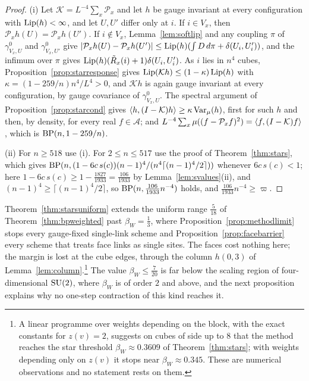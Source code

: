 \begin{proof}
(i) Let $\mathcal K=L^{-4}\sum_x\mathcal P_x$ and let $h$ be gauge invariant at
every configuration with $\operatorname{Lip}(h)<\infty$, and let $U,U'$ differ only at $i$.
If $i\in V_x$, then $\mathcal P_xh(U)=\mathcal P_xh(U')$. If $i\notin V_x$,
Lemma~\ref{lem:softlip} and any coupling $\pi$ of $\gamma^0_{V_x,U}$ and
$\gamma^0_{V_x,U'}$ give $|\mathcal P_xh(U)-\mathcal P_xh(U')|\le\operatorname{Lip}(h)(\int
D\,d\pi+\delta(U_i,U'_i))$, and the infimum over $\pi$ gives
$\operatorname{Lip}(h)(\tilde R_x(i)+1)\delta(U_i,U'_i)$. As $i$ lies in $n^4$ cubes,
Proposition~\ref{prop:starresponse} gives $\operatorname{Lip}(\mathcal Kh)\le(1-\kappa)
\operatorname{Lip}(h)$ with $\kappa=(1-259/n)n^4/L^4>0$, and $\mathcal Kh$ is again gauge
invariant at every configuration, by gauge covariance of $\gamma^0_{V_x,U}$.
The spectral argument of Proposition~\ref{prop:starcond} gives
$\langle h,(I-\mathcal K)h\rangle\ge\kappa\operatorname{Var}_\mu(h)$, first for such $h$ and then, by
density, for every real $f\in\mathcal A$; and $L^{-4}\sum_x\mu((f-\mathcal
P_xf)^2)=\langle f,(I-\mathcal K)f\rangle$, which is $\mathrm{BP}(n,1-259/n)$.

(ii) For $n\ge518$ use (i). For $2\le n\le517$ use the proof of
Theorem~\ref{thm:stars}, which gives $\mathrm{BP}(n,(1-6c\,s(c))(n-1)^4/(n^4\lceil
(n-1)^4/2\rceil))$ whenever $6c\,s(c)<1$; here $1-6c\,s(c)\ge1-\frac{1827}
{1933}=\frac{106}{1933}$ by Lemma~\ref{lem:svalues}(ii), and $(n-1)^4\ge
\lceil(n-1)^4/2\rceil$, so $\mathrm{BP}(n,\frac{106}{1933}n^{-4})$ holds, and
$\frac{106}{1933}n^{-4}\ge\varpi$.
\end{proof}

Theorem~\ref{thm:starsuniform} extends the uniform range $\frac5{18}$ of
Theorem~\ref{thm:bpweighted} past $\beta_W=\frac13$, where
Proposition~\ref{prop:methodlimit} stops every gauge-fixed single-link
scheme and Proposition~\ref{prop:facebarrier} every scheme that treats face
links as single sites. The faces cost nothing here; the margin is lost at the
cube edges, through the column $h(0,3)$ of Lemma~\ref{lem:column}.\footnote{A
linear programme over weights depending on the block, with the exact
constants for $z(v)=2$, suggests on cubes of side up to $8$ that the method
reaches the star threshold $\beta_W\approx0.3609$ of Theorem~\ref{thm:stars};
with weights depending only on $z(v)$ it stops near $\beta_W\approx0.345$.
These are numerical observations and no statement rests on them.} The value
$\beta_W\le\frac7{20}$ is far below the scaling region of four-dimensional
$\mathrm{SU}(2)$, where $\beta_W$ is of order $2$ and above, and the next proposition
explains why no one-step contraction of this kind reaches it.

